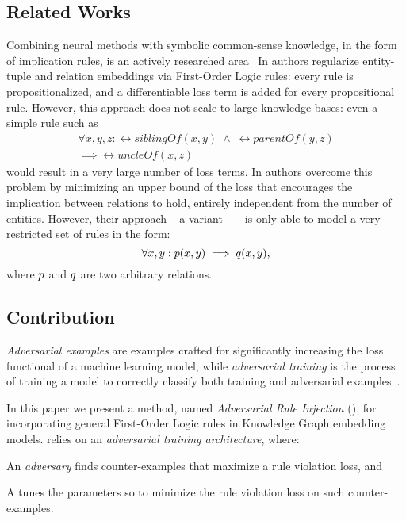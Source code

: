 \subsection{Related Works}

%
Combining neural methods with symbolic common-sense knowledge, \eg in the form of implication rules, is an actively researched area~\cite{DBLP:conf/cikm/WangMC14,DBLP:conf/ijcai/WangWG15,DBLP:journals/corr/VendrovKFU15,DBLP:conf/akbc/RocktaschelR16,DBLP:conf/emnlp/DemeesterRR16}
%
In \cite{DBLP:conf/naacl/RocktaschelSR15} authors regularize entity-tuple and relation embeddings via First-Order Logic rules: every rule is propositionalized, and a differentiable loss term is added for every propositional rule.
%
However, this approach does not scale to large knowledge bases: even a simple rule such as
%
\begin{equation*}
 \begin{aligned}
  \forall x, y, z: \rel{siblingOf}(x, y) \; \land \; \rel{parentOf}(y, z) \\ \implies \rel{uncleOf}(x, z)
 \end{aligned}
\end{equation*}
%
\noindent would result in a very large number of loss terms.
%
In \cite{DBLP:conf/emnlp/DemeesterRR16} authors overcome this problem by minimizing an upper bound of the loss that encourages the implication between relations to hold, entirely independent from the number of entities.
%
However, their approach -- a variant ~\cite{DBLP:conf/RiedelYMM13} -- is only able to model a very restricted set of rules in the form:
%
\[ \forall x, y : p(x, y) \implies q(x, y), \]
%
\noindent where $p$ and $q$ are two arbitrary relations.
%

\subsection{Contribution}

%
\emph{Adversarial examples} are examples crafted for significantly increasing the loss functional of a machine learning model, while \emph{adversarial training} is the process of training a model to correctly classify both training and adversarial examples~\cite{szegedy14:intriguing,goodfellow15:harnessing}.
%

%
In this paper we present a method, named \emph{Adversarial Rule Injection} (\ARI), for incorporating general First-Order Logic rules in Knowledge Graph embedding models.
%
\ARI relies on an \emph{adversarial training architecture}, where:
%
\begin{inparaenum}[1)]
%
 \item An \emph{adversary} finds counter-examples that maximize a rule violation loss, and
%
 \item A tunes the parameters so to minimize the rule violation loss on such counter-examples.
%
\end{inparaenum}
%

